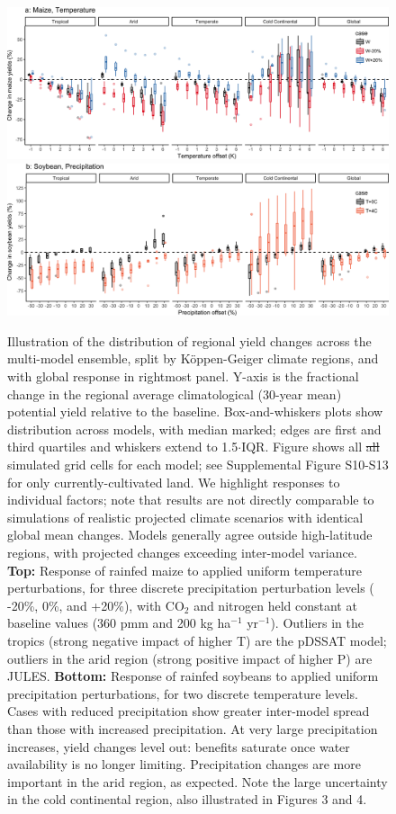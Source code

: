 \documentclass[gmd, manuscript]{copernicus} %
\providecommand{\DIFdel}[1]{{\protect\color{red}\sout{#1}}}                      %
\providecommand{\DIFdelFL}[1]{\DIFdel{#1}} %
\providecommand{\DIFdelbeginFL}{} %
\providecommand{\DIFdelendFL}{} %
\begin{document}
\begin{figure}[ht]
  \centering
  \includegraphics[width=15cm]{figures/maize_sim_CG_T.png}
  \includegraphics[width=15cm]{figures/soy_sim_CG_W.png}
  \caption{
  Illustration of the distribution of regional yield changes across the multi-model ensemble, split by K\"{o}ppen-Geiger climate regions, and with global response in rightmost panel.
  Y-axis is the fractional change in the regional average climatological (30-year mean) potential yield relative to the baseline.
  Box-and-whiskers plots show distribution across models, with median marked; edges are first and third quartiles and whiskers extend to 1.5$\cdot$IQR.
  Figure shows all \DIFdelbeginFL \DIFdelFL{all }\DIFdelendFL simulated grid cells for each model; see Supplemental Figure S10-S13 for only currently-cultivated land. We highlight responses to individual factors; note that results are not directly comparable to simulations of realistic projected climate scenarios with identical global mean changes.  
  Models generally agree outside high-latitude regions, with projected changes exceeding inter-model variance.
  \textbf{Top:} Response of rainfed maize to applied uniform temperature perturbations, for three discrete precipitation perturbation levels ( -20\%, 0\%, and +20\%), with CO$_2$ and nitrogen held constant at baseline values (360 pmm and 200 kg ha$^{-1}$ yr$^{-1}$).
  Outliers in the tropics (strong negative impact of higher T) are the pDSSAT model; outliers in the arid region (strong positive impact of higher P) are JULES.
  \textbf{Bottom:} 
  Response of rainfed soybeans to applied uniform precipitation perturbations, for two discrete temperature levels.
  Cases with reduced precipitation show greater inter-model spread than those with increased precipitation.
  At very large precipitation increases, yield changes level out: benefits saturate once water availability is no longer limiting.
  Precipitation changes are more important in the arid region, as expected. 
  Note the large uncertainty in the cold continental region, also illustrated in Figures 3 and 4.
  }
  \label{fig:maizerice}
\end{figure}
\end{document}
